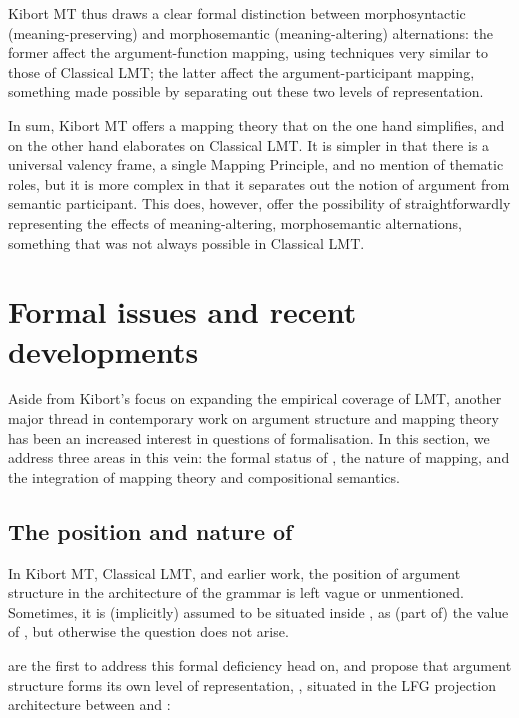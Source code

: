 \documentclass[output=paper]{langscibook}
\begin{document}
Kibort MT thus draws a clear formal distinction between morphosyntactic
(meaning-preserving) and morphosemantic (meaning-altering) alternations: the
former affect the argument-function mapping, using techniques very similar to
those of Classical LMT; the latter affect the argument-participant mapping,
something made possible by separating out these two levels of representation.

In sum, Kibort MT offers a mapping theory that on the one hand simplifies, and
on the other hand elaborates on Classical LMT. It is simpler in that there is a
universal valency frame, a single Mapping Principle, and no mention of thematic
roles, but it is more complex in that it separates out the notion of argument
from semantic participant. This does, however, offer the possibility of
straightforwardly representing the effects of meaning-altering, morphosemantic
alternations, something that was not always possible in Classical LMT.


\section{Formal issues and recent developments}\label{sec:argstr:formal-issues}

Aside from Kibort's focus on expanding the empirical coverage of LMT, another
major thread in contemporary work on argument structure and mapping theory has
been an increased interest in questions of formalisation. In this section, we
address three areas in this vein: the formal status of \astruc, the nature of
mapping, and the integration of mapping theory and compositional semantics.

\subsection{The position and nature of \astruc}\label{sec:argstr:position-of-astruc}

In Kibort MT, Classical LMT, and earlier work, the position of argument
structure in the architecture of the grammar is left vague or unmentioned.
Sometimes, it is (implicitly) assumed to be situated inside \fstruc, as (part
of) the value of \PRED, but otherwise the question does not arise.

\citet[1]{butt1997architecture} are the first to address this formal deficiency
head on, and propose that argument structure forms its own level of
representation, \astruc{}, situated in the LFG projection architecture between
 and :
\end{document}
